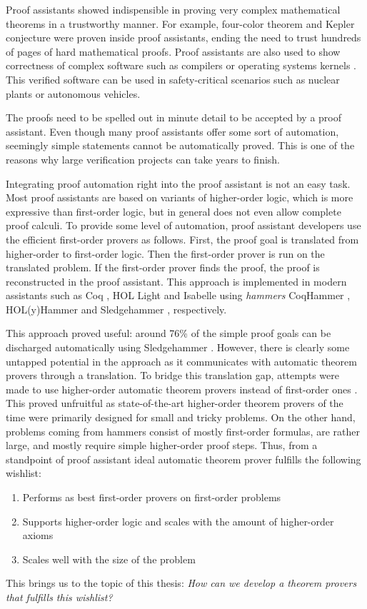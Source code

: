 Proof assistants showed indispensible in proving very complex mathematical theorems in a
trustworthy manner. For example, four-color theorem \cite{gg-2008-four-color}
and Kepler conjecture \cite{th-2015-kepler} were proven inside proof assistants,
ending the need to trust hundreds of pages of hard mathematical proofs. Proof
assistants are also used to show correctness of complex software such as
compilers \cite{xl-09-compcert} or operating systems kernels \cite{gk-09-sel4}.
This verified software can be used in safety-critical scenarios such as nuclear
plants or autonomous vehicles.

The proofs need to be spelled out in minute detail to be accepted by a proof assistant.
Even though many proof assistants offer some sort of automation, seemingly simple
statements cannot be automatically proved. This is one of the reasons why large
verification projects can take years to finish.

Integrating proof automation right into the proof assistant is not an easy task.
Most proof assistants are based on variants of higher-order logic, which is more
expressive than first-order logic, but in general does not even allow complete
proof calculi. To provide some level of automation, proof assistant developers
use the efficient first-order provers as follows. First, the proof goal is
translated from higher-order to first-order logic. Then the first-order prover
is run on the translated problem. If the first-order prover finds the proof, the
proof is reconstructed in the proof assistant. This approach is implemented in
modern assistants such as Coq \cite{bc-04-coq}, HOL Light \cite{jh-09-hol-light}
and Isabelle \cite{lc-88-isabelle} using \emph{hammers} CoqHammer
\cite{ck-18-coqhammer}, HOL(y)Hammer \cite{ku-15-holyhammer} and Sledgehammer
\cite{bn-10-sh}, respectively. 

This approach proved useful: around 76\% of the simple proof goals can be
discharged automatically using Sledgehammer \cite{bgkku-16-larning-fact-selector}. However, there is
clearly some untapped potential in the approach as it communicates with
automatic theorem provers through a translation. To bridge this translation gap,
attempts were made to use higher-order automatic theorem provers instead of
first-order ones \cite{ns-13-leo2sh}. This proved unfruitful as state-of-the-art
higher-order theorem provers of the time were primarily designed for small and
tricky problems. On the other hand, problems coming from hammers consist of
mostly first-order formulas, are rather large, and mostly require simple
higher-order proof steps. Thus, from a standpoint of proof assistant ideal
automatic theorem prover fulfills the following wishlist:
\begin{enumerate}
  \item\label{it:fo} Performs as best first-order provers on first-order problems
  \item\label{it:ho} Supports higher-order logic and scales with the amount of higher-order axioms
  \item\label{it:size} Scales well with the size of the problem
\end{enumerate}
This brings us to the topic of this thesis: \emph{How can we develop a theorem provers that fulfills this wishlist?}

